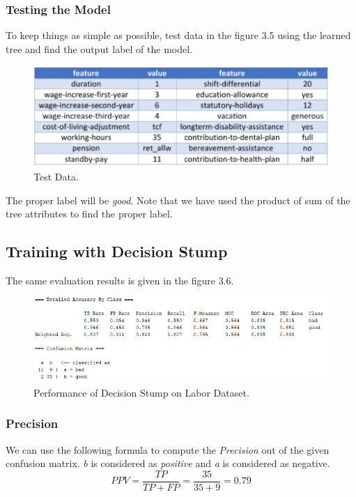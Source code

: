 \documentclass[12pt]{article}
\numberwithin{equation}{section}
\numberwithin{table}{section}
\numberwithin{figure}{section}
\begin{document}
\subsubsection{Testing the Model}
To keep things as simple as possible, test data in the figure 3.5 using the learned tree and find the output label of the model.
\begin{figure}[!h]
	\centering
	\includegraphics[scale=0.8]{2_5.png}
	\caption{Test Data.}
	\label{fig:PropProf}
\end{figure}

The proper label will be \textit{good}. Note that we have used the product of sum of the tree attributes to find the proper label.

\subsection{Training with Decision Stump}
The same evaluation results is given in the figure 3.6.

\begin{figure}[!h]
	\centering
	\includegraphics[scale=1]{2_6.png}
	\caption{Performance of Decision Stump on Labor Dataset.}
	\label{fig:PropProf}
\end{figure}

\subsubsection{Precision}
We can use the following formula to compute the \textit{Precision} out of the given confusion matrix. \textit{b} is considered as \textit{positive} and \textit{a} is considered as negative.
$$
PPV = \frac{TP}{TP + FP} = \frac{35}{35 + 9} = 0.79
$$
\end{document}
